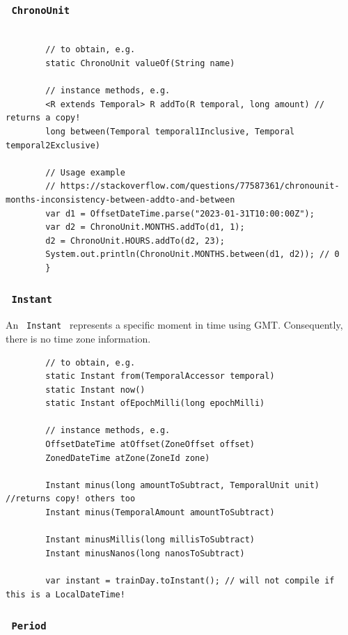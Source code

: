 \documentclass{scrartcl}
\begin{document}
\subsubsection{\lstinline$ ChronoUnit $}

    \begin{lstlisting}

        // to obtain, e.g.
        static ChronoUnit valueOf(String name)

        // instance methods, e.g.
        <R extends Temporal> R addTo(R temporal, long amount) // returns a copy!
        long between(Temporal temporal1Inclusive, Temporal temporal2Exclusive)

        // Usage example
        // https://stackoverflow.com/questions/77587361/chronounit-months-inconsistency-between-addto-and-between
        var d1 = OffsetDateTime.parse("2023-01-31T10:00:00Z");
        var d2 = ChronoUnit.MONTHS.addTo(d1, 1);
        d2 = ChronoUnit.HOURS.addTo(d2, 23);
        System.out.println(ChronoUnit.MONTHS.between(d1, d2)); // 0
        }
\end{lstlisting}

\subsubsection{\lstinline$ Instant $}

     An \lstinline$ Instant $ represents a specific moment in time using GMT.
    Consequently, there is no time zone information.

    \begin{lstlisting}
        // to obtain, e.g.
        static Instant from(TemporalAccessor temporal)
        static Instant now()
        static Instant ofEpochMilli(long epochMilli)

        // instance methods, e.g.
        OffsetDateTime atOffset(ZoneOffset offset)
        ZonedDateTime atZone(ZoneId zone)

        Instant minus(long amountToSubtract, TemporalUnit unit) //returns copy! others too
        Instant minus(TemporalAmount amountToSubtract)

        Instant minusMillis(long millisToSubtract)
        Instant minusNanos(long nanosToSubtract)

        var instant = trainDay.toInstant(); // will not compile if this is a LocalDateTime!

    \end{lstlisting}

\subsubsection{\lstinline$ Period $}
\end{document}
